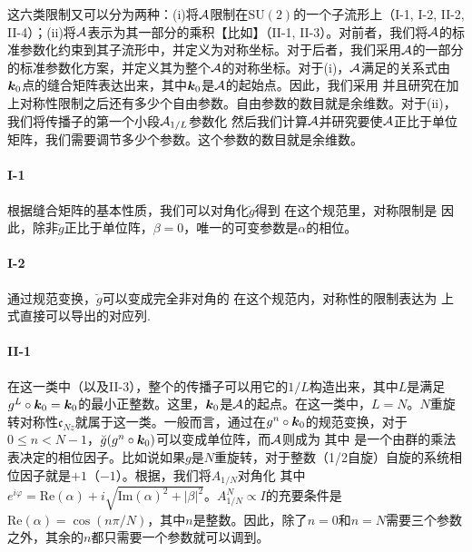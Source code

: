 这六类限制又可以分为两种：(i)将${\cal A}$限制在$\text{SU}(2)$的一个子流形上（I-1, I-2, II-2, II-4）；(ii)将${\cal A}$表示为其一部分的乘积【比如】（II-1, II-3）。对前者，我们将${\cal A}$的标准参数化约束到其子流形中，并定义为对称坐标。对于后者，我们采用${\cal A}$的一部分的标准参数化方案，并定义其为整个${\cal A}$的对称坐标。对于(i)，${\cal A}$满足的关系式由$\boldsymbol{k}_0$点的缝合矩阵表达出来，其中$\boldsymbol{k}_0$是${\cal A}$的起始点。因此，我们采用
并且研究在加上对称性限制之后还有多少个自由参数。自由参数的数目就是余维数。对于(ii)，我们将传播子的第一个小段${\cal A}_{1/L}$参数化
然后我们计算${\cal A}$并研究要使${\cal A}$正比于单位矩阵，我们需要调节多少个参数。这个参数的数目就是余维数。

\paragraph*{I-1} 根据缝合矩阵的基本性质，我们可以对角化$\breve{g}$得到
在这个规范里，对称限制是
因此，除非$\breve{g}$正比于单位阵，$\beta=0$，唯一的可变参数是$\alpha$的相位。

\paragraph*{I-2} 通过规范变换，$\breve{g}$可以变成完全非对角的
在这个规范内，对称性的限制表达为
上式直接可以导出的对应列.

\paragraph*{II-1} 在这一类中（以及II-3），整个的传播子可以用它的$1/L$构造出来，其中$L$是满足$g^L\circ \boldsymbol{k}_0=\boldsymbol{k}_0$的最小正整数。这里，$\boldsymbol{k}_0$是${\cal A}$的起点。在这一类中，$L=N$。$N$重旋转对称性$\mathfrak{c}_{Nz}$就属于这一类。一般而言，通过在$g^n\circ \boldsymbol{k}_0$的规范变换，对于$0 \le n < N-1$，$\breve{g}(g^n\circ \boldsymbol{k}_0)$可以变成单位阵，而${\cal A}$则成为
其中
是一个由群的乘法表决定的相位因子。比如说如果$g$是$N$重旋转，对于整数（1/2自旋）自旋的系统相位因子就是$+1$（$-1$）。根据，我们将$A_{1/N}$对角化 
其中$e^{i\varphi}=\text{Re}(\alpha)+i\sqrt{\text{Im}(\alpha)^2+|\beta|^2}$。$A_{1/N}^N \propto I$的充要条件是$\text{Re}(\alpha)=\cos(n\pi/N)$，其中$n$是整数。因此，除了$n=0$和$n=N$需要三个参数之外，其余的$n$都只需要一个参数就可以调到。

